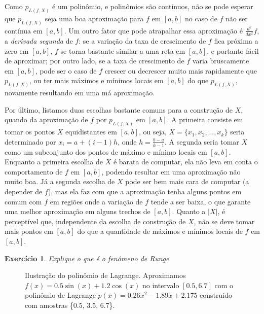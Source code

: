 \documentclass[]{article}
\newtheorem{exercicio}{Exercício}
\numberwithin{equation}{section}
\begin{document}
Como $p_{L(f, X)}$ é um polinômio, e polinômios são contínuos, não se pode esperar que $p_{L(f, X)}$ seja uma boa aproximação para $f$ em $[a, b]$ no caso de $f$ não ser contínua em $[a, b]$. Um outro fator que pode atrapalhar essa aproximação é $\frac{d^2}{dx^2} f$, a \emph{derivada segunda} de $f$: se a variação da taxa de crescimento de $f$ fica próxima a zero em $[a, b]$, $f$ se torna bastante similar a uma reta em $[a, b]$, e portanto fácil de aproximar; por outro lado, se a taxa de crescimento de $f$ varia bruscamente em $[a, b]$, pode ser o caso de $f$ crescer ou decrescer muito mais rapidamente que $p_{L(f, X)}$, ou ter mais máximos e mínimos locais em $[a, b]$ do que $p_{L(f, X)}$, novamente resultando em uma má aproximação.

Por último, listamos duas escolhas bastante comuns para a construção de $X$, quando da aproximação de $f$ por $p_{L(f, X)}$ em $[a, b]$. A primeira consiste em tomar os pontos $X$ equidistantes em $[a, b]$, ou seja, $X = \{x_1, x_2, \dots, x_k\}$ seria determinado por $x_i = a + (i - 1)h$, onde $h = \frac{b - a}{k - 1}$. A segunda seria tomar $X$ como um subconjunto dos pontos de máximo e mínimo locais em $[a, b]$. Enquanto a primeira escolha de $X$ é barata de computar, ela não leva em conta o comportamento de $f$ em $[a, b]$, podendo resultar em uma aproximação não muito boa. Já a segunda escolha de $X$ pode ser bem mais cara de computar (a depender de $f$), mas ela faz com que a aproximação tenha alguns pontos em comum com $f$ em regiões onde a variação de $f$ tende a ser baixa, o que garante uma melhor aproximação em alguns trechos de $[a, b]$. Quanto a $|X|$, é perceptível que, independente da escolha de construção de $X$, não se deve tomar mais pontos em $[a, b]$ do que a quantidade de máximos e mínimos locais de $f$ em $[a, b]$.

\begin{exercicio} \label{exercicioFenomenoRunge}
	Explique o que é o \emph{fenômeno de Runge}
\end{exercicio}

\begin{figure}
  \centering
  \caption{Ilustração do polinômio de Lagrange. Aproximamos
    $f(x) = 0.5\sin(x) + 1.2\cos(x)$ no intervalo $[0.5, 6.7]$ com o
    polinômio de Lagrange $p(x) = 0.26x^2 -1.89x + 2.175$ construído
    com amostras \{0.5, 3.5, 6.7\}.}
\end{figure}
\end{document}
